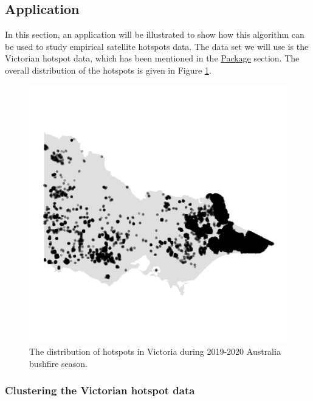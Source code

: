 \hypertarget{application}{%
\subsection{Application}\label{application}}

In this section, an application will be illustrated to show how this
algorithm can be used to study empirical satellite hotspots data. The
data set we will use is the Victorian hotspot data, which has been
mentioned in the \protect\hyperlink{package}{Package} section. The
overall distribution of the hotspots is given in Figure
\ref{fig:hotspots}.

\begin{Schunk}
\begin{figure}

{\centering \includegraphics[width=0.8\linewidth]{figures/before_clustering} 

}

\caption[The distribution of hotspots in Victoria during 2019-2020 Australia bushfire season]{The distribution of hotspots in Victoria during 2019-2020 Australia bushfire season.}\label{fig:hotspots}
\end{figure}
\end{Schunk}

\hypertarget{clustering-the-victorian-hotspot-data}{%
\subsubsection{Clustering the Victorian hotspot
data}\label{clustering-the-victorian-hotspot-data}}

